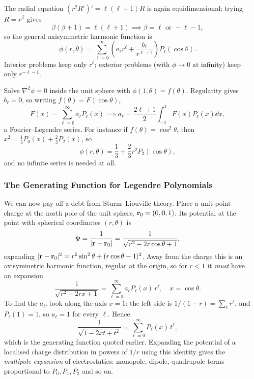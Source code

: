 \documentclass[a4paper]{scrartcl}
\begin{document}
The radial equation $(r^2 R')' = \ell(\ell+1) R$ is again equidimensional; trying $R = r^\beta$ gives
$$
\beta(\beta + 1) = \ell (\ell + 1) \implies \beta = \ell \text{ or } -\ell - 1,
$$
so the general axisymmetric harmonic function is
$$
\phi(r, \theta) = \sum_{\ell = 0}^{\infty}\left(a_\ell r^\ell + \frac{b_\ell}{r^{\ell + 1}}\right) P_\ell(\cos \theta).
$$
Interior problems keep only $r^\ell$; exterior problems (with $\phi \rightarrow 0$ at infinity) keep only $r^{-\ell - 1}$.

\begin{example}
    Solve $\nabla^2 \phi = 0$ inside the unit sphere with $\phi(1, \theta) = f(\theta)$. Regularity gives $b_\ell = 0$, so writing $f(\theta) = F(\cos\theta)$,
    $$
    F(x) = \sum_{\ell = 0}^{\infty} a_\ell P_\ell(x) \implies a_\ell = \frac{2 \ell + 1}{2}\int_{-1}^{1} F(x) P_\ell(x) \dd x,
    $$
    a Fourier--Legendre series. For instance if $f(\theta) = \cos^2\theta$, then $x^2 = \frac{1}{3}P_0(x) + \frac{2}{3} P_2(x)$, so
    $$
    \phi(r, \theta) = \frac{1}{3} + \frac{2}{3} r^2 P_2(\cos\theta),
    $$
    and no infinite series is needed at all.
\end{example}

\subsubsection*{The Generating Function for Legendre Polynomials}

We can now pay off a debt from Sturm--Liouville theory. Place a unit point charge at the north pole of the unit sphere, $\mathbf{r}_0 = (0, 0, 1)$. Its potential at the point with spherical coordinates $(r, \theta)$ is
$$
\Phi = \frac{1}{\lvert\mathbf{r} - \mathbf{r}_0\rvert} = \frac{1}{\sqrt{r^2 - 2 r \cos \theta + 1}},
$$
expanding $\lvert\mathbf{r} - \mathbf{r}_0\rvert^2 = r^2 \sin^2 \theta + (r\cos\theta - 1)^2$. Away from the charge this is an axisymmetric harmonic function, regular at the origin, so for $r < 1$ it \emph{must} have an expansion
$$
\frac{1}{\sqrt{r^2 - 2r x + 1}} = \sum_{\ell = 0}^{\infty} a_\ell P_\ell(x)\, r^\ell, \quad x = \cos \theta.
$$
To find the $a_\ell$, look along the axis $x = 1$: the left side is $1/(1 - r) = \sum_\ell r^\ell$, and $P_\ell(1) = 1$, so $a_\ell = 1$ for every $\ell$. Hence
$$
\frac{1}{\sqrt{1 - 2xt + t^2}} = \sum_{\ell = 0}^{\infty} P_\ell(x)\, t^\ell,
$$
which is the generating function quoted earlier. Expanding the potential of a localised charge distribution in powers of $1/r$ using this identity gives the \emph{multipole expansion} of electrostatics: monopole, dipole, quadrupole terms proportional to $P_0, P_1, P_2$ and so on.
\end{document}
